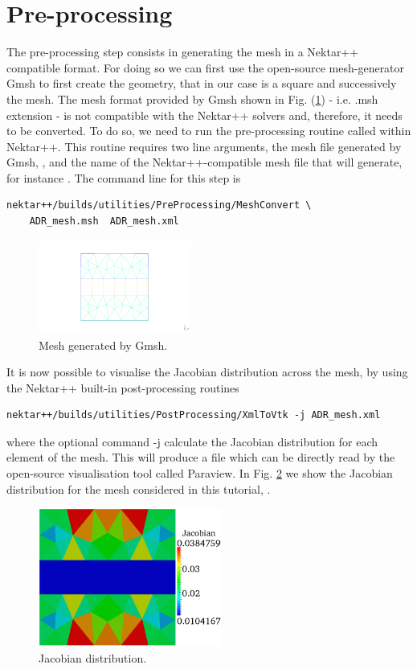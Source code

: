 \section{Pre-processing}
\label{adr-pre}
The pre-processing step consists in generating the mesh in a Nektar++ compatible format.
For doing so we can first use the open-source mesh-generator Gmsh to first create the geometry,
that in our case is a square and successively the mesh. The mesh format provided by Gmsh shown 
in Fig. (\ref{f:gmsh}) - i.e. .msh extension - is not compatible with the Nektar++ solvers and, therefore, 
it needs to be converted.
To do so, we need to run the pre-processing routine called  within Nektar++.
This routine requires two line arguments, the mesh file generated by Gmsh, ,
and the name of the Nektar++-compatible mesh file that  will generate, 
for instance . The command line for this step is
%
\begin{lstlisting}[style=BashInputStyle]
nektar++/builds/utilities/PreProcessing/MeshConvert \
    ADR_mesh.msh  ADR_mesh.xml
\end{lstlisting}
%
%
\begin{figure}[h!]
\begin{center}
\includegraphics[width=5cm]{Figures/ADR_mesh_gmsh}
\caption{Mesh generated by Gmsh.}
\label{f:gmsh}
\end{center}
\end{figure}
%
It is now possible to visualise the Jacobian distribution across the mesh,  
by using the Nektar++ built-in post-processing routines
%
\begin{lstlisting}[style=BashInputStyle]
nektar++/builds/utilities/PostProcessing/XmlToVtk -j ADR_mesh.xml 
\end{lstlisting}
%
where the optional command -j calculate the Jacobian distribution for each element of the mesh.
This will produce a \inlsh{ADR\_mesh.vtu} file which can be directly read by the open-source 
visualisation tool called Paraview. In Fig. \ref{f:Jac} we show the Jacobian distribution for the 
mesh considered in this tutorial, \inlsh{ADR\_mesh.xml}.
%
\begin{figure}[h!]
\begin{center}
\includegraphics[width=6cm]{Figures/ADR_mesh_jacobian.png}
\caption{Jacobian distribution.}
\label{f:Jac}
\end{center}
\end{figure}
